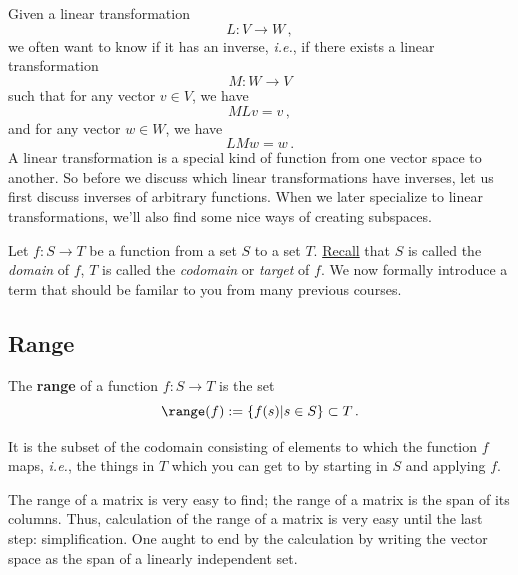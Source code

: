 

\chapter{}\label{kernelrank}

Given a linear transformation \[L \colon V \to W\, ,\] we often want  to know if it has an inverse, {\itshape i.e.}, if there exists a linear transformation \[M \colon W \to V\] such that for any vector \(v \in V\), we have \[MLv=v\, ,\] and for any vector \(w \in W\), we have \[LMw=w\, .\] A linear transformation is a special kind of function from one vector space to another. So before we discuss which linear transformations have inverses, let us first discuss inverses of arbitrary functions. When we later specialize to linear transformations, we'll also find some nice ways of creating subspaces.

Let \(f \colon S \to T\) be a function from a set \(S\) to a set \(T\). \href{\webworkurl Homework0-Background/3/}{Recall} that \(S\) is called the {\itshape domain} of \(f\), \(T\) is called the {\itshape codomain} or {\itshape target} of \(f\).  
We now formally introduce a term that should be familar to you from many previous courses.

\section{Range}

\begin{definition} 
The {\bfseries range}  of a function $f:S\to T$ is  the set
\[
\range (f):=\left\{ f(s) | s\in S \right\}\subset T\, .
\]
\end{definition} 
It is the subset of the codomain consisting of elements  to which the function \(f\) maps, {\itshape i.e.}, the things in \(T\) which you can get to by starting in \(S\) and applying \(f\). 

The range of a matrix is very easy to find; the range of a matrix is the span of its columns. 
Thus, calculation of the range of a matrix is very easy until the last step: simplification. One aught to end by the calculation by writing the vector space as the span of a linearly independent set. 


